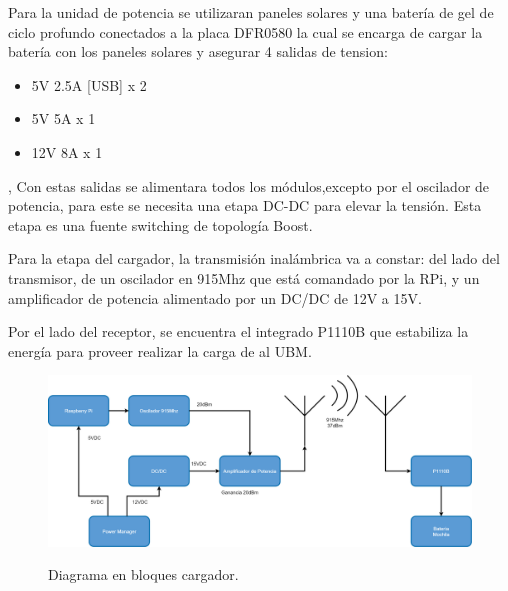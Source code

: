Para la unidad de potencia se utilizaran paneles solares y una batería de gel de ciclo profundo conectados a la  placa DFR0580  la cual se encarga de cargar la batería con los paneles solares y asegurar 4 salidas de tension:
\begin{itemize}
\item 5V 2.5A [USB] x 2
\item 5V 5A x 1 
\item 12V 8A x 1
\end{itemize} ,
Con estas salidas se alimentara todos los módulos,excepto por el oscilador de potencia, para este se necesita una etapa DC-DC para elevar la tensi\'on.
Esta etapa es una fuente switching de topolog\'ia Boost.



Para la etapa del cargador, la transmisión inalámbrica va a constar: del lado del transmisor, de un oscilador en 915Mhz que est\'a comandado por la RPi, y un amplificador de potencia alimentado por un DC/DC de 12V a 15V.

Por el lado del receptor, se encuentra el integrado P1110B que estabiliza la energía para proveer realizar la carga de al UBM.

\begin{figure}[H]
	\centering
	\includegraphics[width=0.9\linewidth]{ImagenesIngenieria de Detalle/EsquemaHardwareAntenas}
	\label{fig:diagrama_hardware_antenas}
	\caption{Diagrama en bloques cargador.}
\end{figure}


